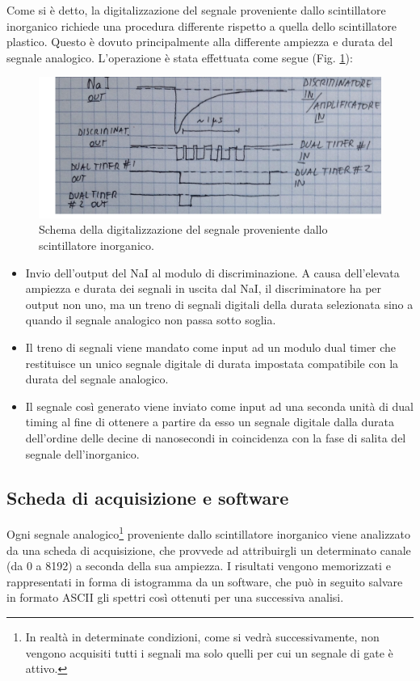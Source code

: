 \documentclass[8pt]{extarticle}
\begin{document}
Come si è detto, la digitalizzazione del segnale proveniente dallo scintillatore inorganico richiede una procedura differente rispetto a quella dello scintillatore plastico. Questo è dovuto principalmente alla differente ampiezza e durata del segnale analogico. L'operazione è stata effettuata come segue (Fig. \ref{fig:dual_1}): \\

\begin{figure}
\begin{center}
\includegraphics[scale=0.25]{dual_1}
\caption{Schema della digitalizzazione del segnale proveniente dallo scintillatore inorganico.}
\label{fig:dual_1}
\end{center}
\end{figure}

\begin{itemize}
	\item Invio dell'output del NaI al modulo di discriminazione. A causa dell'elevata ampiezza e durata dei segnali in uscita dal NaI, il discriminatore ha per output non uno, ma un treno di segnali digitali della durata selezionata sino a quando il segnale analogico non passa sotto soglia.
	\item Il treno di segnali viene mandato come input ad un modulo dual timer che restituisce un unico segnale digitale di durata impostata compatibile con la durata del segnale analogico.
	\item Il segnale così generato viene inviato come input ad una seconda unità di dual timing al fine di ottenere a partire da esso un segnale digitale dalla durata dell'ordine delle decine di nanosecondi in coincidenza con la fase di salita del segnale dell'inorganico.
\end{itemize}

\subsection{Scheda di acquisizione e software}
Ogni segnale analogico\footnote{In realtà in determinate condizioni, come si vedrà successivamente, non vengono acquisiti tutti i segnali ma solo quelli per cui un segnale di gate è attivo.} proveniente dallo scintillatore inorganico viene analizzato da una scheda di acquisizione, che provvede ad attribuirgli un determinato canale (da 0 a 8192) a seconda della sua ampiezza. I risultati vengono memorizzati e rappresentati in forma di istogramma da un software, che può in seguito salvare in formato ASCII gli spettri così ottenuti per una successiva analisi. 
\end{document}
